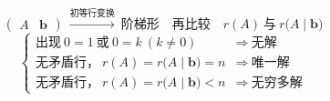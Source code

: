 \begin{secbox}
\begin{formbox}
\[
\left(\begin{array}{c|c}A&\boldsymbol b\end{array}\right)
\ \overset{\text{初等行变换}}{\longrightarrow}\ \text{阶梯形}
\quad\text{再比较}\quad r(A)\ \text{与}\ r\big(A\mid\boldsymbol b\big)
\]
\[
\left\{
\begin{array}{ll}
\text{出现}\ 0=1\ \text{或}\ 0=k\ (k\ne0) & \Rightarrow\ \text{无解}\\[4pt]
\text{无矛盾行，}\ r(A)=r\big(A\mid\boldsymbol b\big)=n & \Rightarrow\ \text{唯一解}\\[4pt]
\text{无矛盾行，}\ r(A)=r\big(A\mid\boldsymbol b\big)<n & \Rightarrow\ \text{无穷多解}
\end{array}
\right.
\]
\end{formbox}
\end{secbox}

